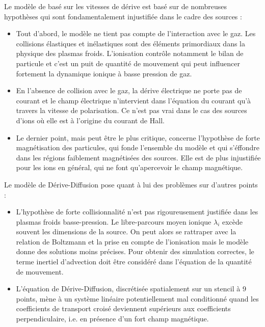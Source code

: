 \begin{refsection}
Le modèle de basé sur les vitesses de dérive est basé sur de nombreuses
hypothèses qui sont fondamentalement injustifiée dans le cadre des sources :

\begin{itemize}
  \item Tout d'abord, le modèle ne tient pas compte de l'interaction avec le
  gaz. Les collisions élastiques et inélastiques sont des éléments
  primordiaux dans la physique des plasmas froids. L'ionisation contrôle
  notamment le bilan de particule et c'est un puit de quantité de mouvement qui
  peut influencer fortement la dynamique ionique à basse pression de gaz.
  \item En l'absence de collision avec le gaz, la dérive électrique ne porte pas
  de courant et le champ électrique n'intervient dans l'équation du courant qu'à
  travers la vitesse de polarisation. Ce n'est pas vrai dans le cas des sources
  d'ions où elle est à l'origine du courant de Hall.
  \item Le dernier point, mais peut être le plus critique, concerne l'hypothèse
  de forte magnétisation des particules, qui fonde l'ensemble du modèle et qui
  s'éffondre dans les régions faiblement magnétisées des sources. Elle est de
  plus injustifiée pour les ions en général, qui ne font qu'apercevoir le champ
  magnétique.
\end{itemize}

Le modèle de Dérive-Diffusion pose quant à lui des problèmes sur d'autres points
:

\begin{itemize}
  \item L'hypothèse de forte collisionnalité n'est pas rigoureusement justifiée
  dans les plasmas froids basse-pression. Le libre-parcours moyen ionique
  $\lambda_i$ excède souvent les dimensions de la source. On peut alors se
  rattraper avec la relation de Boltzmann et la prise en compte de l'ionisation
  mais le modèle donne des solutions moins précises. Pour obtenir des
  simulation correctes, le terme inertiel d'advection doit être considéré dans
  l'équation de la quantité de mouvement.
  \item L'équation de Dérive-Diffusion, discrétisée spatialement sur un
	stencil à 9 points, mène à un système linéaire potentiellement mal conditionné
	quand les coefficients de transport croisé deviennent supérieurs aux
	coefficients perpendiculaire, i.e. en présence d'un fort champ magnétique.
\end{itemize}

%
%
\end{refsection}

